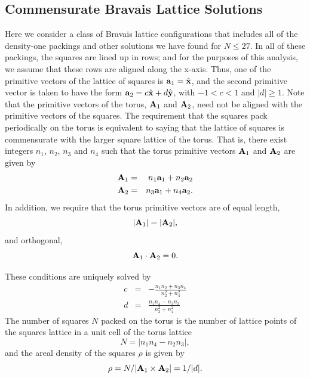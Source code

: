 \documentclass[preprint,aps]{revtex4}
\newcommand{\ax}{{\bf a}_1}
\newcommand{\ay}{{\bf a}_2}
\newcommand{\Ax}{{\bf A}_1}
\newcommand{\Ay}{{\bf A}_2}
\begin{document}
\subsection{Commensurate Bravais Lattice Solutions}
Here we consider a class of Bravais lattice configurations that includes all of the density-one packings and other solutions we have found for  $N \leq 27$.   In all of these packings, the squares are lined up in rows; and for the purposes of this analysis, we assume that these rows are aligned along the x-axis. Thus, one of the primitive vectors of the lattice of squares is $\ax=\hat{{\bf x}}$, and the second primitive vector is taken to have the form $\ay=c \hat{{\bf x}} + d \hat{{\bf y}}$, with $-1< c <1$ and  $|d|\geq 1$.  Note that the primitive vectors of the torus, $\Ax$ and $\Ay$, need not be aligned with the primitive vectors of the squares.     The requirement that the squares pack periodically on the torus is equivalent to saying that the lattice of squares is commensurate with the larger square lattice of the torus.  That is, there exist  integers $n_1$, $n_2$, $n_3$ and $n_4$ such that the torus primitive vectors $\Ax$ and $\Ay$ are given by
\begin{eqnarray} 
\label{eqn:Ana}
\Ax&=& n_1 \ax + n_2 \ay \nonumber \\ 
\Ay&=&n_3 \ax + n_4 \ay.
\end{eqnarray}
In addition, we require that the torus primitive vectors are of equal length,
\begin{equation}
\label{eqn:normal}
|\Ax|=|\Ay| ,
\end{equation}
and orthogonal,
\begin{equation}
\label{eqn:ortho}
\Ax \cdot \Ay = 0 .
\end{equation}

These conditions are uniquely solved by
\begin{eqnarray}\label{eq:gap}
c &=& - \frac{n_1 n_2 + n_3 n_4}{n_2^2 + n_4^2}\\
d &=& \frac{n_1 n_4 - n_2 n_3}{n_2^2 + n_4^2} \nonumber
\end{eqnarray}
The number of squares $N$ packed on the torus is the number of lattice points of the squares lattice in a unit cell of the torus lattice
\begin{equation}
\label{eqn:N}
N = |n_1 n_4 - n_2 n_3|,
\end{equation}
and the areal density of the squares $\rho$ is given by
\begin{equation}
\label{ }
\rho=N/|\Ax \times \Ay| = 1/|d|.
\end{equation}
\end{document}
